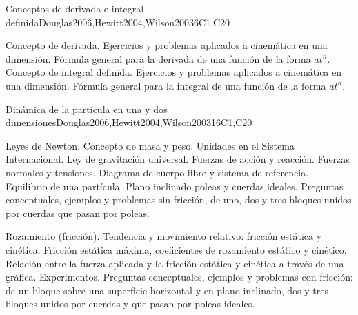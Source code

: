 \begin{syllabus}
\begin{unit}{Conceptos de derivada e integral definida}{}{Douglas2006,Hewitt2004,Wilson2003}{6}{C1,C20}
\begin{topics}
      \item Concepto de derivada. Ejercicios y problemas aplicados a cinemática en una dimensión. Fórmula general para la derivada de una función de la forma $at^{n}$. Concepto de integral definida. Ejercicios y problemas aplicados a cinemática en una dimensión. Fórmula general para la integral de una función de la forma $at^{n}$.
\end{topics}

\end{unit}

\begin{unit}{Dinámica de la partícula en una y dos dimensiones}{}{Douglas2006,Hewitt2004,Wilson2003}{16}{C1,C20}
\begin{topics}
      \item Leyes de Newton. Concepto de masa y peso. Unidades en el Sistema Internacional. Ley de gravitación universal. Fuerzas de acción y reacción. Fuerzas normales y tensiones. Diagrama de cuerpo libre y sistema de referencia. Equilibrio de una partícula. Plano inclinado poleas y cuerdas ideales. Preguntas conceptuales, ejemplos y problemas sin fricción, de uno, dos y tres bloques unidos por cuerdas que pasan por poleas.
      \item Rozamiento (fricción). Tendencia y movimiento relativo: fricción estática y cinética. Fricción estática máxima, coeficientes de rozamiento estático y cinético. Relación entre la fuerza aplicada y la fricción estática y cinética a través de una gráfica. Experimentos. Preguntas conceptuales, ejemplos y problemas con fricción: de un bloque sobre una superficie horizontal y en plano inclinado, dos y tres bloques unidos por cuerdas y que pasan por poleas ideales.
   \end{topics}
\end{unit}



\begin{coursebibliography}
\end{coursebibliography}

\end{syllabus}
